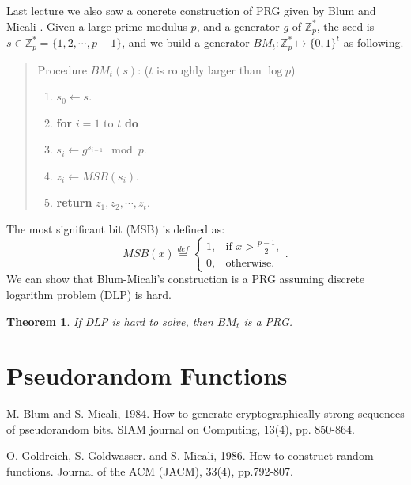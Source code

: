 \documentclass[12pt]{article}
\newcommand{\eqdef}{\stackrel{def}{=}}
\newcommand{\Z}{\mathbb{Z}}
\newcommand{\bits}{\{0,1\}}
\newcommand{\tab}{\hspace{0.3in}}
\newtheorem{theorem}{Theorem}[section]
\theoremstyle{definition}
\begin{document}
Last lecture we also saw a concrete construction of PRG given by Blum and Micali \cite{BM84}.
Given a large prime modulus $p$, and a generator $g$ of $\Z_p^*$, the seed is $s \in \Z_p^* = \{1,2,\cdots,p-1\}$, and we build a generator $BM_t : \Z_p^* \mapsto \bits^t$ as following.
\begin{quote}
Procedure $BM_t(s)$: ($t$ is roughly larger than $\log p$)
\begin{enumerate}
\item $s_0 \gets s$.
\item {\bf for} $i=1$ to $t$ {\bf do}
\item \tab $s_i \gets g^{s_{i-1}} \mod p$.
\item \tab $z_i \gets MSB(s_i)$.
\item {\bf return} $z_1,z_2,\cdots,z_t$.
\end{enumerate}
\end{quote}
The most significant bit (MSB) is defined as:
$$MSB(x) \eqdef \begin{cases}
1, & \textrm{if } x>\frac{p-1}{2}, \\
0, & \textrm{otherwise.}
\end{cases}.$$
We can show that Blum-Micali's construction is a PRG assuming discrete logarithm problem (DLP) is hard.
\begin{theorem}
If DLP is hard to solve, then $BM_t$ is a PRG.
\end{theorem}

\section{Pseudorandom Functions}

\begin{thebibliography}{10}

M. Blum and S. Micali, 1984. 
How to generate cryptographically strong sequences of pseudorandom bits. 
SIAM journal on Computing, 13(4), pp. 850-864.

O. Goldreich, S. Goldwasser. and S. Micali, 1986. 
How to construct random functions. 
Journal of the ACM (JACM), 33(4), pp.792-807.

\end{thebibliography}
\end{document}
